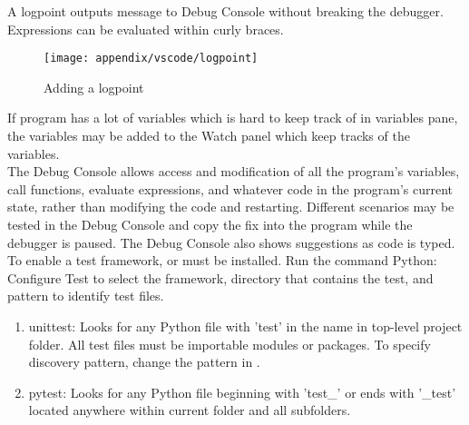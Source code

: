 A logpoint outputs message to Debug Console without breaking the debugger. Expressions can be evaluated within curly braces.

\begin{figure}[H]
\centering
\texttt{[image: appendix/vscode/logpoint]}
\caption{Adding a logpoint}
\end{figure}

If program has a lot of variables which is hard to keep track of in variables pane, the variables may be added to the Watch panel which keep tracks of the variables.\\

The Debug Console allows access and modification of all the program's variables, call functions, evaluate expressions, and whatever code in the program's current state, rather than modifying the code and restarting. Different scenarios may be tested in the Debug Console and copy the fix into the program while the debugger is paused. The Debug Console also shows suggestions as code is typed.\\

To enable a test framework,  or  must be installed. Run the command Python: Configure Test to select the framework, directory that contains the test, and pattern to identify test files.
\begin{enumerate}[label=\roman*.]
\setlength{\itemsep}{0pt}
\item unittest: Looks for any Python file with 'test' in the name in top-level project folder. All test files must be importable modules or packages. To specify discovery pattern, change the pattern in .
\item pytest: Looks for any Python file beginning with 'test\_' or ends with '\_test' located anywhere within current folder and all subfolders.
\end{enumerate}

